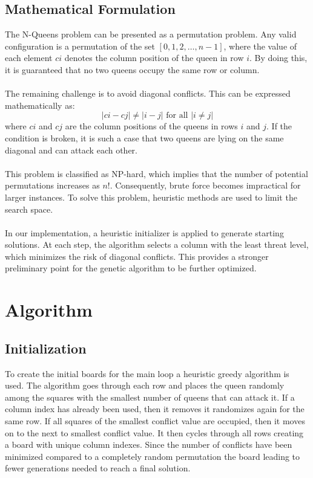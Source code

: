 \documentclass{scrartcl}
\begin{document}
\subsection*{Mathematical Formulation}
The N-Queens problem can be presented as a permutation problem. Any valid configuration is a permutation of the set $[0,1,2,\dots,n-1]$, where the value of each element $ci$ denotes the column position of the queen in row $i$. By doing this, it is guaranteed that no two queens occupy the same row or column. \\ \\ The remaining challenge is to avoid diagonal conflicts. This can be expressed mathematically as: \\ \[ |c i - c j| \neq |i - j| \text{ for all } |i \neq j| \] where $ci$ and $cj$ are the column positions of the queens in rows $i$ and $j$. If the condition is broken, it is such a case that two queens are lying on the same diagonal and can attack each other. \\ \\ This problem is classified as NP-hard, which implies that the number of potential permutations increases as $n!$. Consequently, brute force becomes impractical for larger instances. To solve this problem, heuristic methods are used to limit the search space. \\ \\ In our implementation, a heuristic initializer is applied to generate starting solutions. At each step, the algorithm selects a column with the least threat level, which minimizes the risk of diagonal conflicts. This provides a stronger preliminary point for the genetic algorithm to be further optimized. 

\section{Algorithm}
\label{sec:algorithm}

\subsection*{Initialization} 
To create the initial boards for the main loop a heuristic greedy algorithm is used. The algorithm goes through each row and places the queen randomly among the squares with the smallest number of queens that can attack it. If a column index has already been used, then it removes it randomizes again for the same row. If all squares of the smallest conflict value are occupied, then it moves on to the next to smallest conflict value. It then cycles through all rows creating a board with unique column indexes. Since the number of conflicts have been minimized compared to a completely random permutation the board leading to fewer generations needed to reach a final solution.
\end{document}
